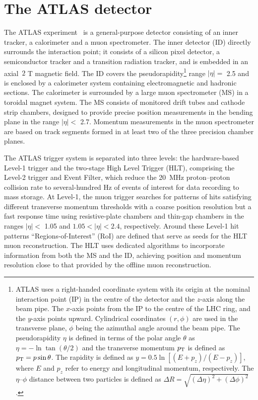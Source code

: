\section{The ATLAS detector}
\label{sec:atlas}

The ATLAS experiment~\cite{ATLASdetector} is a general-purpose detector consisting of an inner tracker, a calorimeter and a muon spectrometer. 
The inner detector (ID) directly surrounds the interaction point; 
it consists of a silicon pixel detector, a semiconductor tracker and a transition radiation tracker, and is embedded in an axial~$2$ T magnetic field.
The ID covers the pseudorapidity\footnote{ATLAS uses a right-handed coordinate system with its origin at the nominal interaction point (IP) 
in the centre of the detector and the $z$-axis along the beam pipe.
The $x$-axis points from the IP to the centre of the LHC ring, and the $y$-axis points upward. Cylindrical 
coordinates $(r,\phi)$ are used in the transverse plane,
$\phi$ being the azimuthal angle around the beam pipe. The pseudorapidity $\eta$ is defined in terms of the 
polar angle $\theta$ as $\eta=-\ln\tan(\theta/2)$ and the
transverse momentum $p_{\rm T}$ is defined as $p_{\rm T}=p\sin\theta$. The rapidity is defined as 
$y=0.5\ln\left[\left( E + p_z \right)/ \left( E - p_z \right)\right]$,
where $E$ and $p_z$ refer to energy and longitudinal momentum, respectively. The $\eta$--$\phi$ distance 
between two particles is defined as
 $\Delta R=\sqrt{(\Delta\eta)^2 + (\Delta\phi)^2}$.}
range $|\eta| = $ 2.5 and is enclosed by a calorimeter system containing
electromagnetic and hadronic sections.
The calorimeter is surrounded by a large muon spectrometer (MS) in a toroidal magnet system.
The MS consists of monitored drift tubes and cathode strip chambers, designed to provide
precise position measurements in the bending plane in the range $|\eta| <$ 2.7.
Momentum measurements in the muon spectrometer are based on track segments formed in at least two of the three precision chamber planes.

The ATLAS trigger system \cite{ATLAS:trig} is separated into three levels: the hardware-based Level-1 trigger
and the two-stage High Level Trigger (HLT), comprising the Level-2 trigger and Event
Filter, which reduce the 20~MHz proton--proton collision rate to several-hundred Hz of events of interest for data recording to mass storage. 
At Level-1, the muon trigger searches for patterns of hits satisfying different transverse momentum thresholds with a coarse 
position resolution but a fast response time using resistive-plate chambers and thin-gap chambers in the ranges $|\eta| <$ 1.05 and $1.05 <|\eta| < 2.4$, respectively.
Around these Level-1 hit patterns ``Regions-of-Interest'' (RoI) are defined that
serve as seeds for the HLT muon reconstruction. 
The HLT uses dedicated algorithms to incorporate information from both the 
MS and the ID, achieving position and momentum resolution close to that provided by the offline muon reconstruction.


